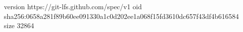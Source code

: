 version https://git-lfs.github.com/spec/v1
oid sha256:0658a281f89b60ee091330a1c0d202ee1a068f15fd3610dc657f43df4b616584
size 32864
